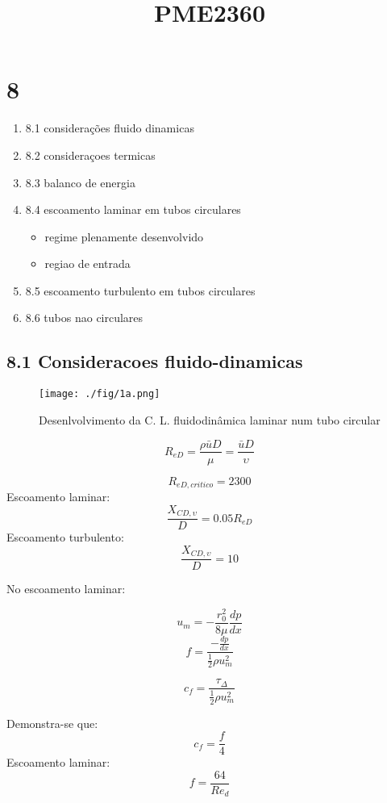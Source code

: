 \documentclass[a4paper, 12pt]{article}
\title{PME2360}
\begin{document}
\maketitle

\section*{8}

\begin{enumerate}
\item 8.1 considerações fluido dinamicas
\item 8.2 consideraçoes termicas
\item 8.3 balanco de energia
\item 8.4 escoamento laminar em tubos circulares
\begin{itemize}
\item regime plenamente desenvolvido
\item regiao de entrada
\end{itemize}
\item 8.5 escoamento turbulento em tubos circulares
\item 8.6 tubos nao circulares
\end{enumerate}

\subsection*{8.1 Consideracoes fluido-dinamicas}
\begin{figure}[h]
\begin{center}
\texttt{[image: ./fig/1a.png]}
\caption{\label{fig:1}Desenlvolvimento da C. L. fluidodinâmica laminar num tubo circular} 
\end{center}
\end{figure}

\[R_{eD}= \frac{\rho \bar{u} D }{\mu } = \frac{\bar{u} D}{\upsilon}\]

\[R_{eD,critico}=2300\]
Escoamento laminar:
\[\frac{X_{CD,\upsilon}}{D} = 0.05R_{eD}\] 
Escoamento turbulento:
\[\frac{X_{CD,\upsilon}}{D} = 10\] 

No escoamento laminar:

\[u_{m}= - \frac{r_{0}^{2}}{8\mu} \frac{dp}{dx}\]
\[f = \frac{-\frac{dp}{dx}}{\frac{1}{2}\rho u_{m}^{2}}\]

\[c_{f}=\frac{\tau_{\Delta}}{\frac{1}{2}\rho u_{m}^{2}}\]

Demonstra-se que: 
\[c_{f} = \frac{f}{4}\]
Escoamento laminar: 
\[f= \frac{64}{Re_{d}}\]
\end{document}
